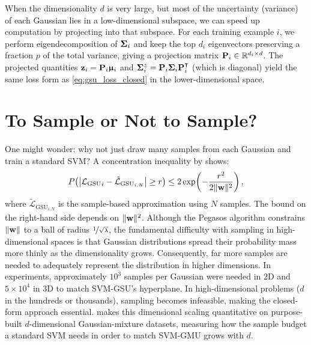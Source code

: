 \documentclass[11pt, letterpaper]{article}
\newcommand{\bSigma}{\vb{\Sigma}}
\newcommand{\bmu}{\boldsymbol{\upmu}}
\newcommand{\R}{\mathbb{R}}
\newcommand{\loss}{\mathcal{L}}
\begin{document}
When the dimensionality $d$ is very large, but most of the uncertainty (variance) of each Gaussian lies in a low-dimensional subspace, we can speed up computation by projecting into that subspace. For each training example $i$, we perform eigendecomposition of $\bSigma_i$ and keep the top $d_i$ eigenvectors preserving a fraction $p$ of the total variance, giving a projection matrix $\vb{P}_i \in \R^{d_i \times d}$. The projected quantities $\vb{z}_i = \vb{P}_i \bmu_i$ and $\bSigma_i^z = \vb{P}_i \bSigma_i \vb{P}_i^{\intercal}$ (which is diagonal) yield the same loss form as \cref{eq:gsu_loss_closed} in the lower-dimensional space.


\section{To Sample or Not to Sample?}\label{sec:sampling}

One might wonder: why not just draw many samples from each Gaussian and train a standard SVM? A concentration inequality by \textcite{cirel2006norms} shows:
\begin{equation}\label{eq:concentration}
    P\!\left(\left|{\loss_{\text{GSU}}}_{i} - \tilde{\loss}_{{\text{GSU}}_{i,N}}\right| \geq r\right) \leq 2\exp\!\left(-\frac{r^2}{2\|\vb{w}\|^2}\right),
\end{equation}
where $\tilde{\loss}_{{\text{GSU}}_{i,N}}$ is the sample-based approximation using $N$ samples. The bound on the right-hand side depends on $\|\vb{w}\|^2$. Although the Pegasos algorithm constrains $\|\vb{w}\|$ to a ball of radius $\nicefrac{1}{\sqrt{\lambda}}$, the fundamental difficulty with sampling in high-dimensional spaces is that Gaussian distributions spread their probability mass more thinly as the dimensionality grows. Consequently, far more samples are needed to adequately represent the distribution in higher dimensions. In experiments, approximately $10^3$ samples per Gaussian were needed in 2D and $5 \times 10^4$ in 3D to match SVM-GSU's hyperplane. In high-dimensional problems ($d$ in the hundreds or thousands), sampling becomes infeasible, making the closed-form approach essential.  makes this dimensional scaling quantitative on purpose-built $d$-dimensional Gaussian-mixture datasets, measuring how the sample budget a standard SVM needs in order to match SVM-GMU grows with $d$.

\end{document}
